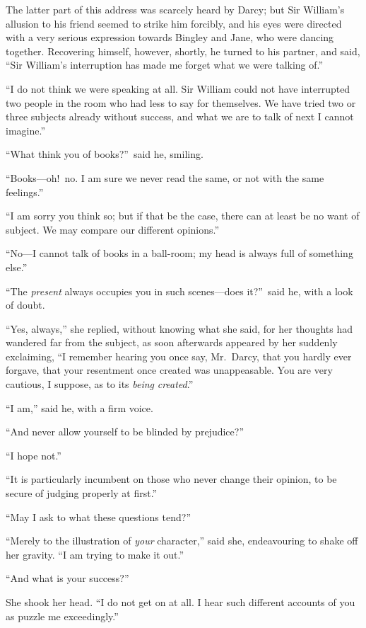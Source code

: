 \documentclass[12pt,english]{book}
\begin{document}
The latter part of this address was scarcely heard by Darcy; but Sir
William's allusion to his friend seemed to strike him forcibly, and
his eyes were directed with a very serious expression towards Bingley
and Jane, who were dancing together. Recovering himself, however,
shortly, he turned to his partner, and said, {}``Sir William's interruption
has made me forget what we were talking of.''

{}``I do not think we were speaking at all. Sir William could not
have interrupted two people in the room who had less to say for themselves.
We have tried two or three subjects already without success, and what
we are to talk of next I cannot imagine.''

{}``What think you of books?''\ said he, smiling.

{}``Books\mbox{---}oh!\ no. I am sure we never read the same, or
not with the same feelings.''

{}``I am sorry you think so; but if that be the case, there can at
least be no want of subject. We may compare our different opinions.''

{}``No\mbox{---}I cannot talk of books in a ball-room; my head is
always full of something else.''

{}``The \textit{present} always occupies you in such scenes\mbox{---}does
it?''\ said he, with a look of doubt.

{}``Yes, always,'' she replied, without knowing what she said, for
her thoughts had wandered far from the subject, as soon afterwards
appeared by her suddenly exclaiming, {}``I remember hearing you once
say, Mr.\ Darcy, that you hardly ever forgave, that your resentment
once created was unappeasable. You are very cautious, I suppose, as
to its \textit{being} \textit{created}.''

{}``I am,'' said he, with a firm voice.

{}``And never allow yourself to be blinded by prejudice?''

{}``I hope not.''

{}``It is particularly incumbent on those who never change their
opinion, to be secure of judging properly at first.''

{}``May I ask to what these questions tend?''

{}``Merely to the illustration of \textit{your} character,'' said
she, endeavouring to shake off her gravity. {}``I am trying to make
it out.''

{}``And what is your success?''\ 

She shook her head. {}``I do not get on at all. I hear such different
accounts of you as puzzle me exceedingly.''
\end{document}
